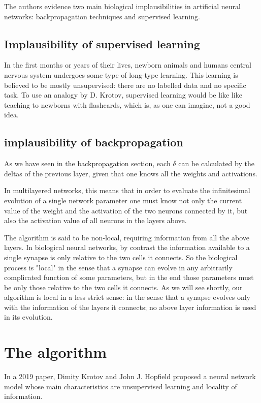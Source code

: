 \documentclass[a4paper]{report}
\begin{document}
The authors evidence two main biological implausibilities in artificial neural networks:
backpropagation techniques and supervised learning.

\subsection{Implausibility of supervised learning}

In the first months or years of their lives, newborn animals and humans central nervous system undergoes some type of long-type learning.
This learning is believed to be mostly unsupervised:
there are no labelled data and no specific task.
To use an analogy by D. Krotov, supervised learning would be like like teaching to newborns with flashcards, which is, as one can imagine, not a good idea.

\subsection{implausibility of backpropagation}
As we have seen in the backpropagation section, each $\delta$ can be calculated by the deltas of the previous layer, given that one knows all the weights and activations.

In multilayered networks, this means that in order to evaluate the infinitesimal evolution of a single network parameter one must know not only the current value of the weight and the activation of the two neurons connected by it, but also the activation value of all neurons in the layers above.

The algorithm is said to be non-local, requiring information from all the above layers.
In biological neural networks, by contrast the information available to a single synapse is only relative to the two cells it connects.
So the biological process is "local" in the sense that a synapse can evolve in any arbitrarily complicated function of some parameters, but in the end those parameters must be only those relative to the two cells it connects.
As we will see shortly, our algorithm is local in a less strict sense: in the sense that a synapse evolves only with the information of the layers it connects; no above layer information is used in its evolution.

\section{The algorithm}
In a 2019 paper, Dimity Krotov and John J. Hopfield proposed a neural network model whose main characteristics are unsupervised learning and locality of information.
\end{document}
